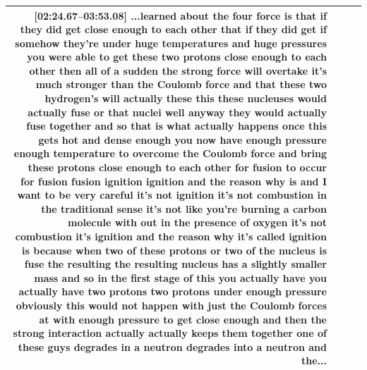 \documentclass[10pt]{article}
\begin{document}
\begin{tiny}
\begin{longtable}{|r|p{0.375in}|p{1.275in}|p{3.5in}|}
                                                                                                                                                                                                                                                                                                                                                    \textbf{[02:24.67--03:53.08]} ...learned about the four force is that if they did get close enough to each other that if they did get if somehow they're under huge temperatures and huge pressures you were able to get these two protons close enough to each other then all of a sudden the strong force will overtake it's much stronger than the Coulomb force and that these two hydrogen's will actually these this these nucleuses would actually fuse or that nuclei well anyway they would actually fuse together and so that is what actually happens once this gets hot and dense enough you now have enough pressure enough temperature to overcome the Coulomb force and bring these protons close enough to each other for fusion to occur for fusion fusion ignition ignition and the reason why is and I want to be very careful it's not ignition it's not combustion in the traditional sense it's not like you're burning a carbon molecule with out in the presence of oxygen it's not combustion it's ignition and the reason why it's called ignition is because when two of these protons or two of the nucleus is fuse the resulting the resulting nucleus has a slightly smaller mass and so in the first stage of this you actually have you actually have two protons two protons under enough pressure obviously this would not happen with just the Coulomb forces at with enough pressure to get close enough and then the strong interaction actually actually keeps them together one of these guys degrades in a neutron degrades into a neutron and the... \\\hline

\end{longtable}
\end{tiny}
\end{document}
